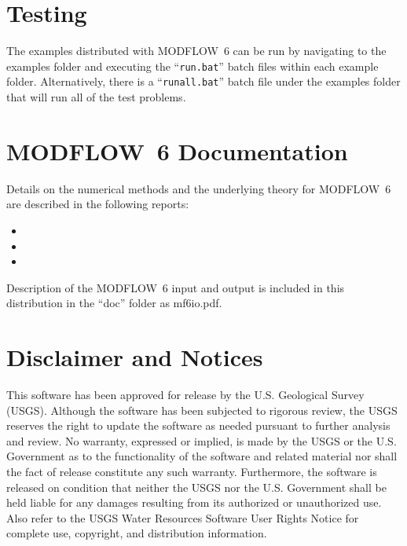\documentclass[11pt,twoside,twocolumn]{usgsreport}
\begin{document}
\section{Testing}
The examples distributed with MODFLOW~6 can be run by navigating to the examples folder and executing the ``\texttt{run.bat}'' batch files within each example folder.  Alternatively, there is a ``\texttt{runall.bat}'' batch file under the examples folder that will run all of the test problems.

\section{MODFLOW~6 Documentation}
Details on the numerical methods and the underlying theory for MODFLOW~6 are described in the following reports:

\begin{itemize}

\item {}

\item {}

\item {}

\end{itemize}
 
\noindent Description of the MODFLOW~6 input and output is included in this distribution in the ``doc'' folder as mf6io.pdf.

\section{Disclaimer and Notices}

This software has been approved for release by the U.S. Geological Survey (USGS). Although the software has been subjected to rigorous review, the USGS reserves the right to update the software as needed pursuant to further analysis and review. No warranty, expressed or implied, is made by the USGS or the U.S. Government as to the functionality of the software and related material nor shall the fact of release constitute any such warranty. Furthermore, the software is released on condition that neither the USGS nor the U.S. Government shall be held liable for any damages resulting from its authorized or unauthorized use. Also refer to the USGS Water Resources Software User Rights Notice for complete use, copyright, and distribution information.
\end{document}
